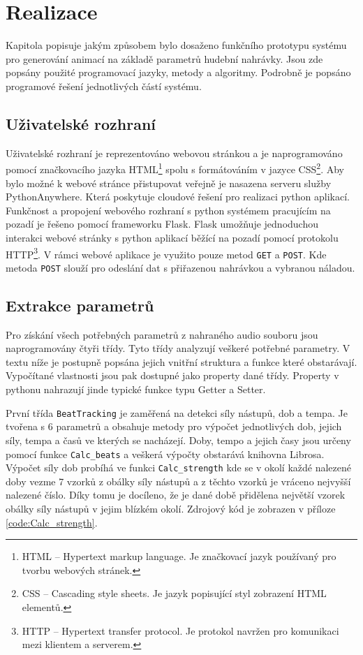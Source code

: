 \section{Realizace} \label{sec:Realizace}

Kapitola popisuje jakým způsobem bylo dosaženo funkčního prototypu systému pro generování animací na základě parametrů hudební nahrávky. Jsou zde popsány použité programovací jazyky, metody a algoritmy. Podrobně je popsáno programové řešení jednotlivých částí systému. 

\subsection{Uživatelské rozhraní}

Uživatelské rozhraní je reprezentováno webovou stránkou a je naprogramováno pomocí značkovacího jazyka \acs{HTML}\footnote{HTML -- Hypertext markup language. Je značkovací jazyk používaný pro tvorbu webových stránek.} spolu s formátováním v jazyce \acs{CSS}\footnote{CSS -- Cascading style sheets. Je jazyk popisující styl zobrazení HTML elementů\cite{CSS}.}. Aby bylo možné k webové stránce přistupovat veřejně je nasazena serveru služby PythonAnywhere. Která poskytuje cloudové řešení pro realizaci python aplikací. Funkčnost a propojení webového rozhraní s python systémem pracujícím na pozadí je řešeno pomocí frameworku Flask. Flask umožňuje jednoduchou interakci webové stránky s python aplikací běžící na pozadí pomocí protokolu HTTP\footnote{HTTP -- Hypertext transfer protocol. Je protokol navržen pro komunikaci mezi klientem a serverem.}. V rámci webové aplikace je využito pouze metod \texttt{GET} a \texttt{POST}. Kde metoda \texttt{POST} slouží pro odeslání dat s přiřazenou nahrávkou a vybranou náladou.

\subsection{Extrakce parametrů} \label{sec:Parameter_extraction}
Pro získání všech potřebných parametrů z nahraného audio souboru jsou naprogramovány čtyři třídy. Tyto třídy analyzují veškeré potřebné parametry. V textu níže je postupně popsána jejich vnitřní struktura a funkce které obstarávají. Vypočítané vlastnosti jsou pak dostupné jako property dané třídy. Property v pythonu nahrazují jinde typické funkce typu Getter a Setter.

První třída \texttt{BeatTracking} je zaměřená na detekci síly nástupů, dob a tempa. Je tvořena s 6 parametrů a obsahuje metody pro výpočet jednotlivých dob, jejich síly, tempa a časů ve kterých se nacházejí. Doby, tempo a jejich časy jsou určeny pomocí funkce \texttt{Calc\_beats} a veškerá výpočty obstarává knihovna Librosa. Výpočet síly dob probíhá ve funkci \texttt{Calc\_strength} kde se v okolí každé nalezené doby vezme 7 vzorků z obálky síly nástupů a z těchto vzorků je vráceno nejvyšší nalezené číslo. Díky tomu je docíleno, že je dané době přidělena největší vzorek obálky síly nástupů v jejim blízkém okolí. Zdrojový kód je zobrazen v příloze \ref{code:Calc_strength}.

